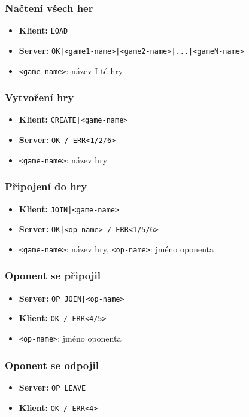 \documentclass[11pt,a4paper]{article}
\begin{document}
\subsubsection*{Načtení všech her}
\begin{itemize}
	\item \textbf{Klient:} \texttt{LOAD}
	\item \textbf{Server:} \texttt{OK|<game1-name>|<game2-name>|...|<gameN-name>}
	\item \texttt{<game-name>}: název I-té hry
\end{itemize}

\subsubsection*{Vytvoření hry}
\begin{itemize}
	\item \textbf{Klient:} \texttt{CREATE|<game-name>}
	\item \textbf{Server:} \texttt{OK / ERR<1/2/6>}
	\item \texttt{<game-name>}: název hry
\end{itemize}

\subsubsection*{Připojení do hry}
\begin{itemize}
	\item \textbf{Klient:} \texttt{JOIN|<game-name>}
	\item \textbf{Server:} \texttt{OK|<op-name> / ERR<1/5/6>}
	\item \texttt{<game-name>}: název hry, \texttt{<op-name>}: jméno oponenta
\end{itemize}

\subsubsection*{Oponent se připojil}
\begin{itemize}
	\item \textbf{Server:} \texttt{OP\_JOIN|<op-name>}
	\item \textbf{Klient:} \texttt{OK / ERR<4/5>}
	\item \texttt{<op-name>}: jméno oponenta
\end{itemize}

\subsubsection*{Oponent se odpojil}
\begin{itemize}
	\item \textbf{Server:} \texttt{OP\_LEAVE}
	\item \textbf{Klient:} \texttt{OK / ERR<4>}
\end{itemize}
\end{document}
